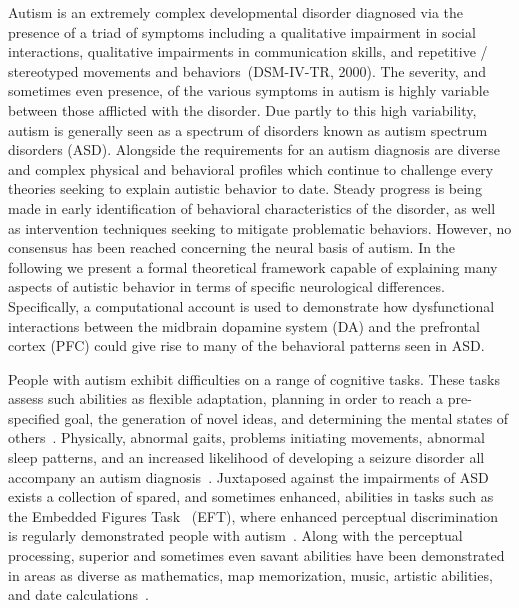 % 
%
%

Autism is an extremely complex developmental disorder diagnosed via the presence of a triad of symptoms including a qualitative impairment in social interactions, qualitative impairments in communication skills, and repetitive / stereotyped movements and behaviors~\nocite{RefWorks:98}(DSM-IV-TR, 2000).  The severity, and sometimes even presence, of the various symptoms in autism is highly variable between those afflicted with the disorder.  Due partly to this high variability, autism is generally seen as a spectrum of disorders known as autism spectrum disorders (ASD).  Alongside the requirements for an autism diagnosis are diverse and complex physical and behavioral profiles which continue to challenge every theories seeking to explain autistic behavior to date.  Steady progress is being made in early identification of behavioral characteristics of the disorder, as well as intervention techniques seeking to mitigate problematic behaviors.  However, no consensus has been reached concerning the neural basis of autism.  In the following we present a formal theoretical framework capable of explaining many aspects of autistic behavior in terms of specific neurological differences.  Specifically, a computational account is used to demonstrate how dysfunctional interactions between the midbrain dopamine system (DA) and the prefrontal cortex (PFC) could give rise to many of the behavioral patterns seen in ASD.

People with autism exhibit difficulties on a range of cognitive tasks.  These tasks assess such abilities as flexible adaptation, planning in order to reach a pre-specified goal, the generation of novel ideas, and determining the mental states of others~\cite{BennettoL:1996:AutismPlanningWCST,Ozonoff:1999:AutismStroopWCST,TurnerW:1999:AutismGenerativity,Baron-Cohen:1985:AutismTOM}.  Physically, abnormal gaits, problems initiating movements, abnormal sleep patterns, and an increased likelihood of developing a seizure disorder all accompany an autism diagnosis~\cite{RefWorks:99,RefWorks:100,RefWorks:101,RefWorks:102}.  Juxtaposed against the impairments of ASD exists a collection of spared, and sometimes enhanced, abilities in tasks such as the Embedded Figures Task~\cite{WitkinHA:1971:EFT} (EFT), where enhanced perceptual discrimination is regularly demonstrated people with autism~\cite{RefWorks:103,RefWorks:104}.  Along with the perceptual processing, superior and sometimes even savant abilities have been demonstrated in areas as diverse as mathematics, map memorization, music, artistic abilities, and date calculations~\cite{RefWorks:105,RefWorks:106,RefWorks:107,RefWorks:37}.   

